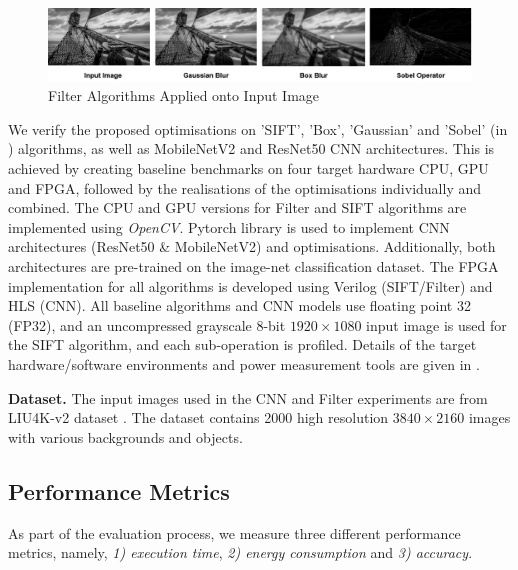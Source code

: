 \begin{figure}[!h]
    \centering
     \includegraphics[width=\columnwidth]{Images/FilterAlgorithms.png}
    \caption{Filter Algorithms Applied onto Input Image}
    \label{fig:FilterAlgorithms}
\end{figure}

We verify the proposed optimisations on 'SIFT', 'Box', 'Gaussian' and 'Sobel' (in ) algorithms, as well as MobileNetV2 and ResNet50 CNN architectures. This is achieved by creating baseline benchmarks on four target hardware CPU, GPU and FPGA, followed by the realisations of the optimisations individually and combined. The CPU and GPU versions for Filter and SIFT algorithms are implemented using \textit{OpenCV}\cite{opencv_library}. Pytorch library is used to implement CNN architectures (ResNet50 \& MobileNetV2) and optimisations. Additionally, both architectures are pre-trained on the image-net classification dataset. The FPGA implementation for all algorithms is developed using Verilog (SIFT/Filter) and HLS (CNN). All baseline algorithms and CNN models use floating point 32 (FP32), and an uncompressed grayscale $8$-bit $1920\times1080$ input image is used for the SIFT algorithm, and each sub-operation is profiled. Details of the target hardware/software environments and power measurement tools are given in . 

\textbf{Dataset.} The input images used in the CNN and Filter experiments are from LIU4K-v2 dataset \cite{LiuliuYan19}. The dataset contains 2000 high resolution $3840\times2160$ images with various backgrounds and objects. 

\subsection{Performance Metrics}

As part of the evaluation process, we measure three different performance metrics, namely, \textit{1) execution time}, \textit{2) energy consumption} and \textit{3) accuracy}.

